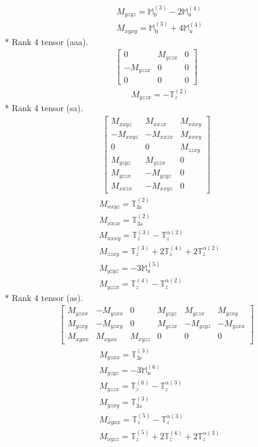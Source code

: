 \documentclass[fleqn,8pt,landscape]{jsarticle}
\begin{document}
\begin{align*}
& M_{yzyz} = \mathbb{M}_{0}^{(3)} - 2 \mathbb{M}_{u}^{(4)} \\
& M_{xyxy} = \mathbb{M}_{0}^{(3)} + 4 \mathbb{M}_{u}^{(4)}
\end{align*}
* Rank 4 tensor (aaa).
\begin{align*}
\begin{bmatrix} 0 & M_{yzzx} & 0 \\ - M_{yzzx} & 0 & 0 \\ 0 & 0 & 0 \end{bmatrix}
\end{align*}
\begin{align*}
& M_{yzzx} = - \mathbb{T}_{z}^{(2)}
\end{align*}
* Rank 4 tensor (sa).
\begin{align*}
\begin{bmatrix} M_{xxyz} & M_{xxzx} & M_{xxxy} \\ - M_{xxyz} & - M_{xxzx} & M_{xxxy} \\ 0 & 0 & M_{zzxy} \\ M_{yzyz} & M_{yzzx} & 0 \\ M_{yzzx} & - M_{yzyz} & 0 \\ M_{xxzx} & - M_{xxyz} & 0 \end{bmatrix}
\end{align*}
\begin{align*}
& M_{xxyz} = \mathbb{T}_{3c}^{(2)} \\
& M_{xxzx} = \mathbb{T}_{3s}^{(2)} \\
& M_{xxxy} = \mathbb{T}_{z}^{(3)} - \mathbb{T}_{z}^{\alpha(2)} \\
& M_{zzxy} = \mathbb{T}_{z}^{(3)} + 2 \mathbb{T}_{z}^{(4)} + 2 \mathbb{T}_{z}^{\alpha(2)} \\
& M_{yzyz} = - 3 \mathbb{M}_{u}^{(5)} \\
& M_{yzzx} = \mathbb{T}_{z}^{(4)} - \mathbb{T}_{z}^{\alpha(2)}
\end{align*}
* Rank 4 tensor (as).
\begin{align*}
\begin{bmatrix} M_{yzxx} & - M_{yzxx} & 0 & M_{yzyz} & M_{yzzx} & M_{yzxy} \\ M_{yzxy} & - M_{yzxy} & 0 & M_{yzzx} & - M_{yzyz} & - M_{yzxx} \\ M_{xyxx} & M_{xyxx} & M_{xyzz} & 0 & 0 & 0 \end{bmatrix}
\end{align*}
\begin{align*}
& M_{yzxx} = \mathbb{T}_{3c}^{(3)} \\
& M_{yzyz} = - 3 \mathbb{M}_{u}^{(6)} \\
& M_{yzzx} = \mathbb{T}_{z}^{(6)} - \mathbb{T}_{z}^{\alpha(3)} \\
& M_{yzxy} = \mathbb{T}_{3s}^{(3)} \\
& M_{xyxx} = \mathbb{T}_{z}^{(5)} - \mathbb{T}_{z}^{\alpha(3)} \\
& M_{xyzz} = \mathbb{T}_{z}^{(5)} + 2 \mathbb{T}_{z}^{(6)} + 2 \mathbb{T}_{z}^{\alpha(3)}
\end{align*}
\end{document}
